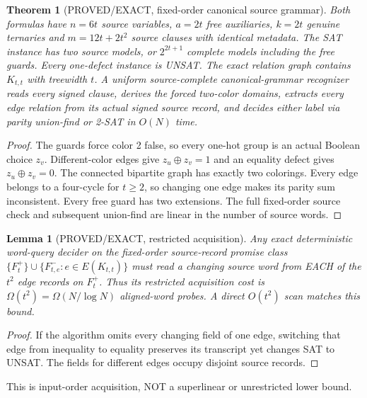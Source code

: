 \documentclass[11pt]{article}
\newtheorem{theorem}{Theorem}
\newtheorem{lemma}{Lemma}
\begin{document}
\begin{theorem}[PROVED/EXACT, fixed-order canonical source grammar]
Both formulas have $n=6t$ source variables, $a=2t$ free auxiliaries, $k=2t$ genuine ternaries and $m=12t+2t^2$ source clauses with identical metadata. The SAT instance has two source models, or $2^{2t+1}$ complete models including the free guards. Every one-defect instance is UNSAT. The exact relation graph contains $K_{t,t}$ with treewidth $t$. A uniform source-complete canonical-grammar recognizer reads every signed clause, derives the forced two-color domains, extracts every edge relation from its actual signed source record, and decides either label via parity union-find or 2-SAT in $O(N)$ time.
\end{theorem}
\begin{proof}
The guards force color 2 false, so every one-hot group is an actual Boolean choice $z_v$. Different-color edges give $z_u\oplus z_v=1$ and an equality defect gives $z_u\oplus z_v=0$. The connected bipartite graph has exactly two colorings. Every edge belongs to a four-cycle for $t\ge2$, so changing one edge makes its parity sum inconsistent. Every free guard has two extensions. The full fixed-order source check and subsequent union-find are linear in the number of source words.
\end{proof}

\begin{lemma}[PROVED/EXACT, restricted acquisition]
Any exact deterministic word-query decider on the fixed-order source-record promise class $\{F_t^+\}\cup\{F_{t,e}^-:e\in E(K_{t,t})\}$ must read a changing source word from EACH of the $t^2$ edge records on $F_t^+$. Thus its restricted acquisition cost is $\Omega(t^2)=\Omega(N/\log N)$ aligned-word probes. A direct $O(t^2)$ scan matches this bound.
\end{lemma}
\begin{proof}
If the algorithm omits every changing field of one edge, switching that edge from inequality to equality preserves its transcript yet changes SAT to UNSAT. The fields for different edges occupy disjoint source records.
\end{proof}
This is input-order acquisition, NOT a superlinear or unrestricted lower bound.
\end{document}
